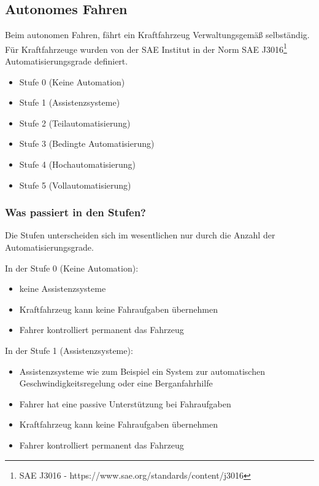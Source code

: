 \subsection{Autonomes Fahren}
Beim autonomen Fahren, fährt ein Kraftfahrzeug Verwaltungsgemäß selbständig.
Für Kraftfahrzeuge wurden von der \ac{SAE} Institut in der Norm SAE J3016\footnote{SAE J3016 - https://www.sae.org/standards/content/j3016} Automatisierungsgrade definiert.
\begin{itemize}
	\item Stufe 0 (Keine Automation)
	\item Stufe 1 (Assistenzsysteme)
	\item Stufe 2 (Teilautomatisierung)
	\item Stufe 3 (Bedingte Automatisierung)
	\item Stufe 4 (Hochautomatisierung)
	\item Stufe 5 (Vollautomatisierung)
\end{itemize}
\subsubsection{Was passiert in den Stufen?}
Die Stufen unterscheiden sich im wesentlichen nur durch die Anzahl der Automatisierungsgrade.

\vspace{0.5cm}

In der Stufe 0 (Keine Automation):
\begin{itemize}
	\item keine Assistenzsysteme
	\item Kraftfahrzeug kann keine Fahraufgaben übernehmen
	\item Fahrer kontrolliert permanent das Fahrzeug
\end{itemize}

\vspace{0.5cm}

In der Stufe 1 (Assistenzsysteme):
\begin{itemize}
	\item Assistenzsysteme wie zum Beispiel ein System zur automatischen Geschwindigkeitsregelung oder eine Berganfahrhilfe
	\item Fahrer hat eine passive Unterstützung bei Fahraufgaben
	\item Kraftfahrzeug kann keine Fahraufgaben übernehmen
	\item Fahrer kontrolliert permanent das Fahrzeug
\end{itemize}

